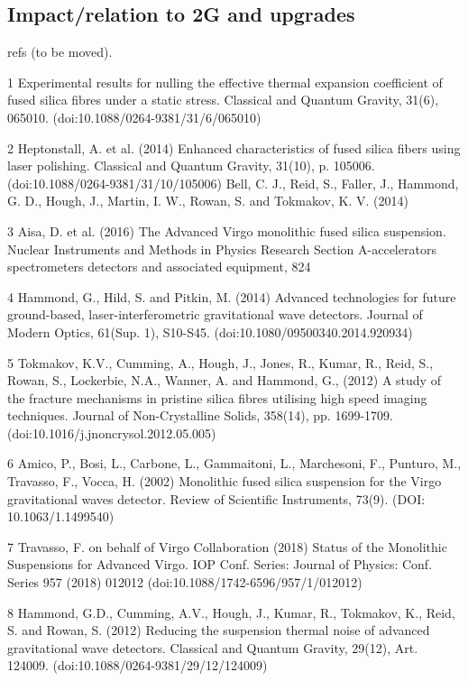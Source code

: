 \subsection{Impact/relation to 2G and upgrades}

refs (to be moved).

1 Experimental results for nulling the effective thermal expansion coefficient of fused silica fibres under a static stress. Classical and Quantum Gravity, 31(6), 065010. (doi:10.1088/0264-9381/31/6/065010)

2 Heptonstall, A. et al. (2014) Enhanced characteristics of fused silica fibers using laser polishing. Classical and Quantum Gravity, 31(10), p. 105006. (doi:10.1088/0264-9381/31/10/105006)
Bell, C. J., Reid, S., Faller, J., Hammond, G. D., Hough, J., Martin, I. W., Rowan, S. and Tokmakov, K. V. (2014) 

3 Aisa, D. et al. (2016) The Advanced Virgo monolithic fused silica suspension. Nuclear Instruments and Methods in Physics Research Section A-accelerators spectrometers detectors and associated equipment, 824

4 Hammond, G., Hild, S. and Pitkin, M. (2014) Advanced technologies for future ground-based, laser-interferometric gravitational wave detectors. Journal of Modern Optics, 61(Sup. 1), S10-S45. (doi:10.1080/09500340.2014.920934)

5 Tokmakov, K.V., Cumming, A., Hough, J., Jones, R., Kumar, R., Reid, S., Rowan, S., Lockerbie, N.A., Wanner, A. and Hammond, G., (2012) A study of the fracture mechanisms in pristine silica fibres utilising high speed imaging techniques. Journal of Non-Crystalline Solids, 358(14), pp. 1699-1709. 
(doi:10.1016/j.jnoncrysol.2012.05.005)

6 Amico, P., Bosi, L., Carbone, L., Gammaitoni, L., Marchesoni, F., Punturo, M., Travasso, F., Vocca, H. (2002) Monolithic fused silica suspension for the Virgo gravitational waves detector. Review of Scientific Instruments, 73(9). (DOI: 10.1063/1.1499540)

7 Travasso, F. on behalf of Virgo Collaboration (2018) Status of the Monolithic Suspensions for Advanced Virgo. IOP Conf. Series: Journal of Physics: Conf. Series 957 (2018) 012012  (doi:10.1088/1742-6596/957/1/012012)

8 Hammond, G.D., Cumming, A.V., Hough, J., Kumar, R., Tokmakov, K., Reid, S. and Rowan, S. (2012) Reducing the suspension thermal noise of advanced gravitational wave detectors. Classical and Quantum Gravity, 29(12), Art. 124009. (doi:10.1088/0264-9381/29/12/124009)

